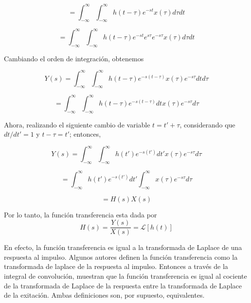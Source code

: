 \documentclass[12pt]{book}
\theoremstyle{definition}
\theoremstyle{remark}
\theoremstyle{plain}
\begin{document}
\begin{equation*}
 = \int_{- \infty}^{\infty}  \int_{- \infty}^{\infty} h(t- \tau) e^{-s t} x(\tau)   d \tau   d t
\end{equation*}

\begin{equation*}
 = \int_{- \infty}^{\infty}  \int_{- \infty}^{\infty} h(t- \tau) e^{-s t}  e^{s \tau} e^{-s \tau} x(\tau)   d \tau   d t
\end{equation*}

Cambiando el orden de integración, obtenemos

\begin{equation*}
Y(s) = \int_{- \infty}^{\infty}  \int_{- \infty}^{\infty} h(t- \tau) e^{-s (t-\tau)}  x(\tau)  e^{-s \tau}  d t d \tau 
\end{equation*}

\begin{equation*}
 = \int_{- \infty}^{\infty}  \int_{- \infty}^{\infty} h(t- \tau) e^{-s (t-\tau)} d t  x(\tau)  e^{-s \tau}  d \tau 
\end{equation*}

Ahora, realizando el siguiente cambio de variable $t=t'+ \tau$, considerando que $d t /d t'=1$ y $t- \tau = t'$; entonces,

\begin{equation*}
 Y(s) = \int_{- \infty}^{\infty}  \int_{- \infty}^{\infty} h(t') e^{-s (t')} d t'  x(\tau)  e^{-s \tau}  d \tau 
\end{equation*}

\begin{equation*}
 = \int_{- \infty}^{\infty}   h(t') e^{-s (t')} d t'  \int_{- \infty}^{\infty}  x(\tau)  e^{-s \tau}  d \tau 
\end{equation*}


\begin{equation*}
 = H(s) X(s)
\end{equation*}

Por lo tanto, la función transferencia esta dada por
\begin{equation}
\label{equ34}
 H(s)= \frac{Y(s)}{X(s)}= \mathcal{L} [h(t)]
\end{equation}

En efecto, la función transferencia es igual a la transformada de Laplace de una respuesta al impulso.
Algunos autores definen la función transferencia como la transformada de laplace de la respuesta al impulso. Entonces a través de la integral de convolución, muestran que la función transferencia es igual al cociente de la transformada de Laplace de la respuesta entre la transformada de Laplace de la exitación. Ambas definiciones son, por supuesto, equivalentes.
\end{document}
